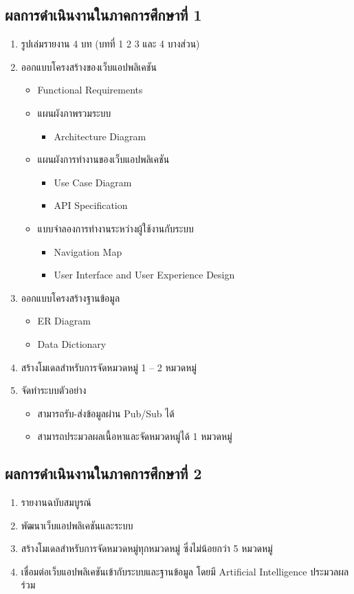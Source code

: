 \documentclass[12pt,oneside,openright,a4paper]{cpe-thai-project}
\begin{document}
\subsection{ผลการดําเนินงานในภาคการศึกษาที่ 1}
\begin{enumerate}
  \item รูปเล่มรายงาน 4 บท (บทที่ 1 2 3 และ 4 บางส่วน)
  \item ออกแบบโครงสร้างของเว็บแอปพลิเคชัน
  \begin{itemize}
    \item Functional Requirements
    \item แผนผังภาพรวมระบบ
    \begin{itemize}
      \item Architecture Diagram
    \end{itemize}
    \item แผนผังการทำงานของเว็บแอปพลิเคชัน
    \begin{itemize}
      \item Use Case Diagram
      \item API Specification
    \end{itemize}
    \item แบบจำลองการทำงานระหว่างผู้ใช้งานกับระบบ
    \begin{itemize}
      \item Navigation Map
      \item User Interface and User Experience Design
    \end{itemize}
  \end{itemize}
  \item ออกแบบโครงสร้างฐานข้อมูล
  \begin{itemize}
    \item ER Diagram
    \item Data Dictionary
  \end{itemize}
  \item สร้างโมเดลสำหรับการจัดหมวดหมู่ 1 – 2 หมวดหมู่
  \item จัดทำระบบตัวอย่าง
  \begin{itemize}
    \item สามารถรับ-ส่งข้อมูลผ่าน Pub/Sub ได้
    \item สามารถประมวลผลเนื้อหาและจัดหมวดหมู่ได้ 1 หมวดหมู่
  \end{itemize}
\end{enumerate}
\subsection{ผลการดําเนินงานในภาคการศึกษาที่ 2} 
\begin{enumerate}
  \item รายงานฉบับสมบูรณ์
  \item พัฒนาเว็บแอปพลิเคชันและระบบ
  \item สร้างโมเดลสำหรับการจัดหมวดหมู่ทุกหมวดหมู่ ซึ่งไม่น้อยกว่า 5 หมวดหมู่
  \item เชื่อมต่อเว็บแอปพลิเคชันเข้ากับระบบและฐานข้อมูล โดยมี Artificial Intelligence ประมวลผลร่วม
\end{enumerate}
\end{document}
